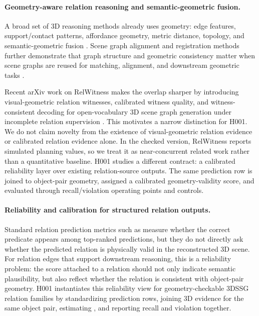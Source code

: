 \paragraph{Geometry-aware relation reasoning and semantic-geometric fusion.}
A broad set of 3D reasoning methods already uses geometry: edge features,
support/contact patterns, affordance geometry, metric distance, topology, and
semantic-geometric fusion
\cite{zhang2021sggpoint,feng2023smka,huang2025fireplace,shao2025great,xie2024sgpgm}.
Scene graph alignment and registration methods further demonstrate that graph
structure and geometric consistency matter when scene graphs are reused for
matching, alignment, and downstream geometric tasks
\cite{sarkar2023sgaligner,xie2024sgpgm}.

Recent arXiv work on RelWitness makes the overlap sharper by introducing
visual-geometric relation witnesses, calibrated witness quality, and
witness-consistent decoding for open-vocabulary 3D scene graph generation under
incomplete relation supervision \cite{nguyen2026relwitness}. This motivates a
narrow distinction for H001. We do not claim novelty from the existence of
visual-geometric relation evidence or calibrated relation evidence alone. In
the checked version, RelWitness reports simulated planning values, so we treat
it as near-concurrent related work rather than a quantitative baseline. H001
studies a different contract: a calibrated reliability layer over existing
relation-source outputs. The same prediction row is joined to object-pair
geometry, assigned a calibrated geometry-validity score, and evaluated through
recall/violation operating points and controls.

\paragraph{Reliability and calibration for structured relation outputs.}
Standard relation prediction metrics such as  measure whether the
correct predicate appears among top-ranked predictions, but they do not
directly ask whether the predicted relation is physically valid in the
reconstructed 3D scene. For relation edges that support downstream reasoning,
this is a reliability problem: the score attached to a relation should not only
indicate semantic plausibility, but also reflect whether the relation is
consistent with object-pair geometry. H001 instantiates this reliability view
for geometry-checkable 3DSSG relation families by standardizing prediction
rows, joining 3D evidence for the same object pair, estimating \pgeom{}, and
reporting recall and violation together.

